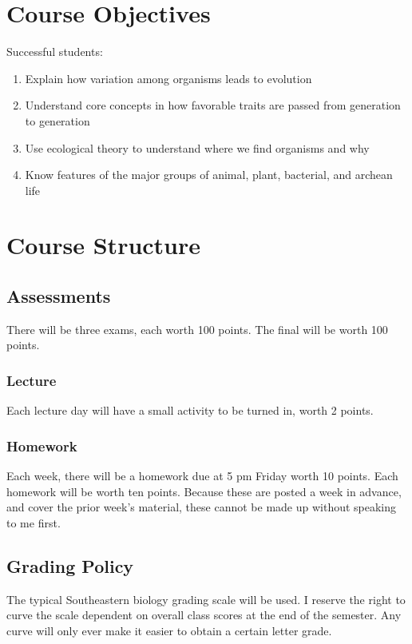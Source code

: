 \documentclass[11pt]{article}
\begin{document}
\section*{Course Objectives}
Successful students:
\begin{enumerate}
\item Explain how variation among organisms leads to evolution
\item Understand core concepts in how favorable traits are passed from generation to generation
\item Use ecological theory to understand where we find organisms and why
\item Know features of the major groups of animal, plant, bacterial, and archean life
\end{enumerate}


\section*{Course Structure}

\subsection*{Assessments}

There will be three exams, each worth 100 points. The final will be worth 100 points.

\subsubsection*{Lecture}

Each lecture day will have a small activity to be turned in, worth 2 points. 


\subsubsection*{Homework}

Each week, there will be a homework due at 5 pm Friday worth 10 points. Each homework will be worth ten points. Because these are posted a week in advance, and cover the prior week's material, these cannot be made up without speaking to me first.

\subsection*{Grading Policy}
The typical Southeastern biology grading scale will be used. I reserve the right to curve the scale dependent on overall class scores at the end of the semester. Any curve will only ever make it easier to obtain a certain letter grade.
\end{document}
